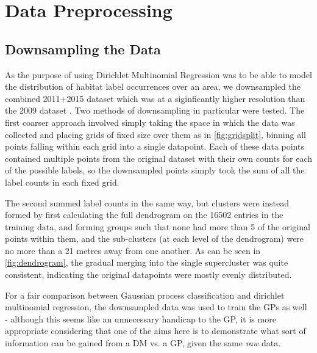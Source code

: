 \section{Data Preprocessing}

\subsection{Downsampling the Data}
As the purpose of using Dirichlet Multinomial Regression was to be able to model the distribution of habitat label occurrences over an area, we downsampled the combined 2011+2015 dataset which was at a siginficantly higher resolution than the 2009 dataset . Two methods of downsampling in particular were tested. The first coarser approach involved simply taking the space in which the data was collected and placing grids of fixed size over them as in \cref{fig:gridsplit}, binning all points falling within each grid into a single datapoint. Each of these data points contained multiple points from the original dataset with their own counts for each of the possible labels, so the downsampled points simply took the sum of all the label counts in each fixed grid. 

The second summed label counts in the same way, but clusters were instead formed by first calculating the full dendrogram on the 16502 entries in the training data, and forming groups such that none had more than 5 of the original points within them, and the sub-clusters (at each level of the dendrogram) were no more than a 21 metres away from one another. As can be seen in \cref{fig:dendrogram}, the gradual merging into the single supercluster was quite consistent, indicating the original datapoints were mostly evenly distributed.

For a fair comparison between Gaussian process classification and dirichlet multinomial regression, the downsampled data was used to train the GPs as well - although this seems like an unnecessary handicap to the GP, it is more appropriate considering that one of the aims here is to demonstrate what sort of information can be gained from a DM vs. a GP, given the same \textit{raw} data.


